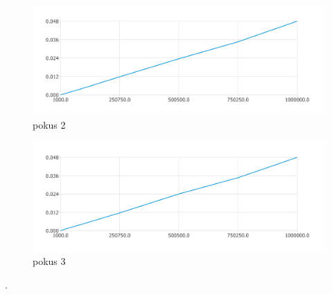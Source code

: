 \documentclass{article}
\begin{document}
\begin{figure}[htbp]
\centering
        \includegraphics[clip, trim=0cm 0cm 0cm 0cm, width=1\textwidth]{pdf17.pdf}
        \caption{pokus 2}
\end{figure}
\begin{figure}[htbp]
\centering
        \includegraphics[clip, trim=0cm 0cm 0cm 0cm, width=1\textwidth]{pdf18.pdf}
        \caption{pokus 3}
\end{figure}
.\\
\bigskip
\clearpage
\newpage
\end{document}
